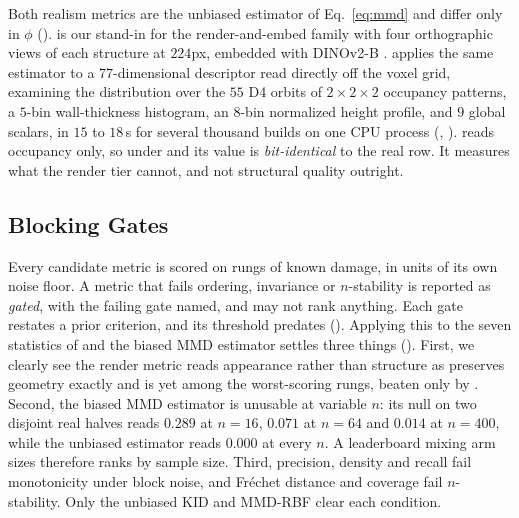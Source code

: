 Both realism metrics are the unbiased estimator of Eq.~\ref{eq:mmd} and differ only in
$\phi$ (). \textbf{\mvkid{}} is our stand-in for the render-and-embed family with four
orthographic views of each structure at $224$px, embedded with DINOv2-B
\citep{oquab2024dinov2}. \textbf{\vkid{}} applies the same estimator to a $77$-dimensional descriptor read
directly off the voxel grid, examining the distribution over the $55$ D4 orbits of
$2\times2\times2$ occupancy patterns, a $5$-bin wall-thickness histogram, an $8$-bin
normalized height profile, and $9$ global scalars, in $15$ to $18$\,s for several thousand builds
on one CPU process (, ).
\vkid{} reads occupancy only, so under
\matshuffle{} and \monochrome{} its value is \emph{bit-identical} to the real row. It measures what the render tier cannot, and not structural quality outright.

\subsection{Blocking Gates}
\label{sec:gates}

Every candidate metric is scored on rungs of known damage, in units of its own noise
floor. A metric that fails ordering, invariance or $n$-stability is reported as
\emph{gated}, with the failing gate named, and may not rank anything. Each gate restates
a prior criterion, and its threshold predates \vkid{} (). Applying this to
the seven statistics of  and the biased MMD estimator settles three
things (). First, we clearly see the render metric reads appearance rather than structure as \matshuffle{} preserves
geometry exactly and is yet among the worst-scoring rungs, beaten only by \monochrome{}.
Second, the biased MMD estimator is unusable at variable $n$: its null on two disjoint
real halves reads $0.289$ at $n{=}16$, $0.071$ at $n{=}64$ and $0.014$ at $n{=}400$,
while the unbiased estimator reads $0.000$ at every $n$. A leaderboard mixing arm sizes
therefore ranks by sample size. Third, precision, density and recall fail monotonicity under
block noise, and Fr\'echet distance and coverage fail $n$-stability. Only the
unbiased KID and MMD-RBF clear each condition.

